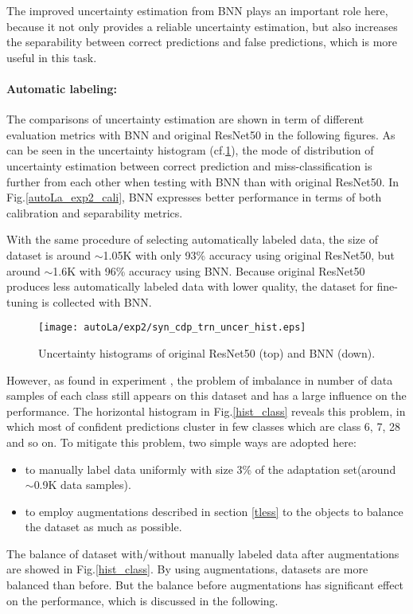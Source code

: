 The improved uncertainty estimation from \gls{BNN} plays an important role here, because it not only provides a reliable uncertainty estimation, but also increases the separability between correct predictions and false predictions, which is more useful in this task. 

\paragraph{Automatic labeling:}
The comparisons of uncertainty estimation are shown in term of different evaluation metrics with \gls{BNN} and original ResNet50 in the following figures. As can be seen in the uncertainty histogram (cf.\ref{autoLa_exp2_hist}), the mode of distribution of uncertainty estimation between correct prediction and miss-classification is further from each other when testing with \gls{BNN} than with original ResNet50. In Fig.\ref{autoLa_exp2_cali}, \gls{BNN} expresses better performance in terms of both calibration and separability metrics. 

With the same procedure of selecting automatically labeled data, the size of dataset is around $\sim$1.05K with only 93\% accuracy using original ResNet50, but around $\sim$1.6K with 96\% accuracy using \gls{BNN}. Because original ResNet50 produces less automatically labeled data with lower quality, the dataset for fine-tuning is collected with \gls{BNN}.

\begin{figure}[H]
	\begin{center}
		\texttt{[image: autoLa/exp2/syn\_cdp\_trn\_uncer\_hist.eps]}
		\caption{Uncertainty histograms of original ResNet50 (top) and \gls{BNN} (down).}		
		\label{autoLa_exp2_hist}
	\end{center}
\end{figure}


However, as found in experiment , the problem of imbalance in number of data samples of each class still appears on this dataset and has a large influence on the performance. The horizontal histogram in Fig.\ref{hist_class} reveals this problem, in which most of confident predictions cluster in few classes which are class 6, 7, 28 and so on. To mitigate this problem, two simple ways are adopted here:
\begin{itemize}
\item to manually label data uniformly with size 3\% of the adaptation set(around $\sim$0.9K data samples).
\item to employ augmentations described in section \ref{tless} to the objects to balance the dataset as much as possible.  
\end{itemize} 
The balance of dataset with/without manually labeled data after augmentations are showed in Fig.\ref{hist_class}. By using augmentations, datasets are more balanced than before. But the balance before augmentations has significant effect on the performance, which is discussed in the following.

